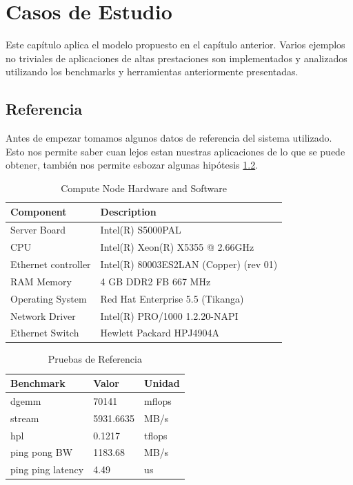 \documentclass[a4paper]{report}
\begin{document}
\chapter{Casos de Estudio}

Este cap\'itulo aplica el modelo propuesto en el cap\'itulo anterior. Varios ejemplos no triviales de aplicaciones de altas prestaciones son implementados
y analizados utilizando los benchmarks y herramientas anteriormente presentadas.

\section{Referencia}

Antes de empezar tomamos algunos datos de referencia del sistema utilizado.
Esto nos permite saber cuan lejos estan nuestras aplicaciones de lo que se
puede obtener, tambi\'en nos permite esbozar algunas hip\'otesis \ref{table:pruebas}.

\begin{table}[H]
    \caption{Compute Node Hardware and Software}
    \centering
    \begin{tabular}{|l|l|}\hline
      {\bf Component} & {\bf Description} \\ \hline
      Server Board & Intel(R) S5000PAL \\ \hline
      CPU & Intel(R) Xeon(R) X5355 @ 2.66GHz \\ \hline
      Ethernet controller & Intel(R) 80003ES2LAN (Copper) (rev 01) \\ \hline
      RAM Memory & 4 GB DDR2 FB 667 MHz \\ \hline
      Operating System & Red Hat Enterprise 5.5 (Tikanga) \\ \hline
      Network Driver & Intel(R) PRO/1000 1.2.20-NAPI \\ \hline
      Ethernet Switch & Hewlett Packard HPJ4904A \\ \hline
    \end{tabular}
    \label{table:testbed}
\end{table}

\begin{table}[H]
\caption{Pruebas de Referencia}
  \begin{center}
    \begin{tabular}{|l|l|l|}\hline
      {\bf Benchmark} & {\bf Valor} & {\bf Unidad} \\ \hline
      dgemm & 70141 & mflops \\ \hline
      stream & 5931.6635 & MB/s \\ \hline
      hpl & 0.1217 & tflops \\ \hline
      ping pong BW & 1183.68 & MB/s \\ \hline
      ping ping latency & 4.49 & us \\ \hline
    \end{tabular}
    \end{center}
 \label{table:pruebas}
\end{table}
\end{document}
